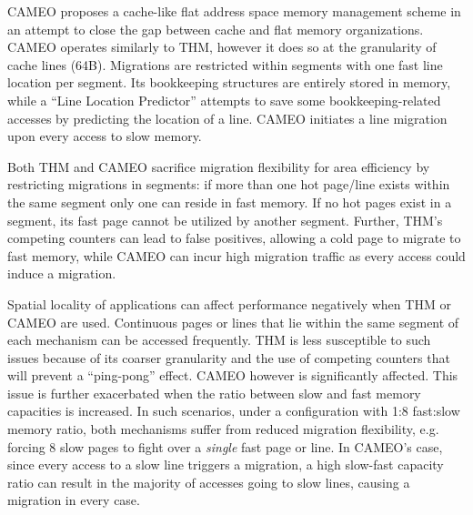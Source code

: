 CAMEO \cite{cameo} proposes a cache-like flat address space memory management scheme in an attempt to close the gap between cache and flat memory organizations. CAMEO operates similarly to THM, however it does so at the granularity of cache lines (64B). Migrations are restricted within segments with one fast line location per segment. Its bookkeeping structures are entirely stored in memory, while a ``Line Location Predictor'' attempts to save some bookkeeping-related accesses by predicting the location of a line. CAMEO initiates a line migration upon every access to slow memory.

Both THM and CAMEO sacrifice migration flexibility for area efficiency by restricting migrations in segments: if more than one hot page/line exists within the same segment only one can reside in fast memory. If no hot pages exist in a segment, its fast page cannot be utilized by another segment. Further, THM's competing counters can lead to false positives, allowing a cold page to migrate to fast memory, while CAMEO can incur high migration traffic as every access could induce a migration. 

Spatial locality of applications can affect performance negatively when THM or CAMEO are used. Continuous pages or lines that lie within the same segment of each mechanism can be accessed frequently. THM is less susceptible to such issues because of its coarser granularity and the use of competing counters that will prevent a ``ping-pong'' effect. CAMEO however is significantly affected. This issue is further exacerbated when the ratio between slow and fast memory capacities is increased. In such scenarios, under a configuration with 1:8 fast:slow memory ratio, both mechanisms suffer from reduced migration flexibility,
e.g. forcing 8 slow pages to fight over a {\em single} fast page or
line.  In CAMEO's case, since every access to a slow line triggers a migration,
a high slow-fast capacity ratio can result in the majority of accesses going
to slow lines, causing a migration in every case.
